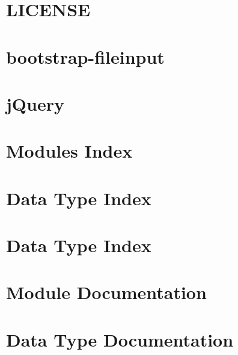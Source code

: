 \documentclass[twoside]{book}
\newcommand{\+}{\discretionary{\mbox{\scriptsize$\hookleftarrow$}}{}{}}
\newcommand{\clearemptydoublepage}{%
  \newpage{\pagestyle{empty}\cleardoublepage}%
}
\begin{document}
\chapter{L\+I\+C\+E\+N\+SE}
\label{md__f_1__git_hub__projects__asdecalidad-1_website_src_website_bower_components_bootstrap-fileinput__l_i_c_e_n_s_e}

\chapter{bootstrap-\/fileinput}
\label{md__f_1__git_hub__projects__asdecalidad-1_website_src_website_bower_components_bootstrap-fileinput__r_e_a_d_m_e}

\chapter{j\+Query}
\label{md__f_1__git_hub__projects__asdecalidad-1_website_src_website_bower_components_jquery__r_e_a_d_m_e}

\chapter{Modules Index}

\chapter{Data Type Index}

\chapter{Data Type Index}

\chapter{Module Documentation}


\chapter{Data Type Documentation}











\backmatter
\newpage
{}
\clearemptydoublepage
{}
\printindex
\end{document}
